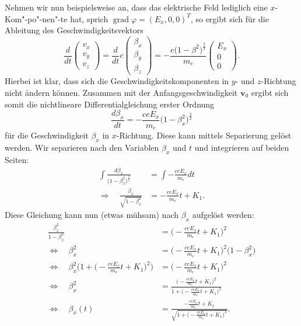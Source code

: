 Nehmen wir nun beispielsweise an,
dass das elektrische Feld lediglich eine \(x\)-Kom"-po"-nen"-te hat,
sprich \( \operatorname{grad} \varphi = (E_x, 0, 0)^T \),
so ergibt sich für die Ableitung des Geschwindigkeitsvektors
\begin{equation}
    \frac{d}{dt}
    \begin{pmatrix}
        v_x \\
        v_y \\
        v_z
    \end{pmatrix} =
    \frac{d}{dt} c
    \begin{pmatrix}
        \beta_x \\
        \beta_y \\
        \beta_z
    \end{pmatrix} =
    - \frac{e \bigl(1-\beta^2\bigr)^\frac{3}{2}}{m_e}
    \begin{pmatrix}
        E_x \\
        0 \\
        0
    \end{pmatrix}.
    \label{relativ:eqn:bsp-abl-v-vec}
\end{equation}
Hierbei ist klar, dass sich die Geschwindigkeitskomponenten
in \(y\)- und \(z\)-Richtung nicht ändern können.
Zusammen mit der Anfangsgeschwindigkeit \(\bm{v}_0\)
ergibt sich somit die nichtlineare Differentialgleichung erster Ordnung
\begin{equation}
    \frac{d\beta_x}{dt} = - \frac{c e E_x}{m_e} \bigl(1-\beta_x^2\bigr)^\frac{3}{2}
\end{equation}
für die Geschwindigkeit \(\beta_x\) in \(x\)-Richtung.
Diese kann mittels Separierung gelöst werden.
Wir separieren nach den Variablen \(\beta_x\) und \(t\)
und integrieren auf beiden Seiten:
\begin{align*}
    \int\frac{d\beta_x}{\bigl(1-\beta_x^2\bigr)^\frac{3}{2}}
    &= \int-\frac{c e E_x}{m_e}dt \\
    \Rightarrow\quad\frac{\beta_x}{\sqrt{1-\beta_x^2}}
    &= -\frac{c e E_x}{m_e}t + K_1.
\end{align*}
Diese Gleichung kann nun (etwas mühsam) nach \(\beta_x\) aufgelöst werden:
\begin{align*}
    \frac{\beta_x^2}{1-\beta_x^2}
    &= \biggl(-\frac{c e E_x}{m_e}t + K_1\biggr)^2\\
    \Leftrightarrow\quad \beta_x^2 &= \biggl(-\frac{c e E_x}{m_e}t + K_1\biggr)^2
    \biggl(1-\beta_x^2\biggr)\\
    \Leftrightarrow\quad
    \beta_x^2 \biggl(1 + \biggl(-\frac{c e E_x}{m_e}t + K_1\biggr)^2\biggr)
    &= \biggl(-\frac{c e E_x}{m_e}t + K_1\biggr)^2\\
    \Leftrightarrow\quad
    \beta_x^2 &= \frac{\biggl(-\frac{c e E_x}{m_e}t + K_1\biggr)^2}
    {1 + \biggl(-\frac{c e E_x}{m_e}t + K_1\biggr)^2}\\
    \Leftrightarrow\quad
    \beta_x(t) &= \frac{-\frac{c e E_x}{m_e}t + K_1}
    {\sqrt{1+\biggl(-\frac{ceE_x}{m_e}t+K_1\biggr)^2}}.
\end{align*}

